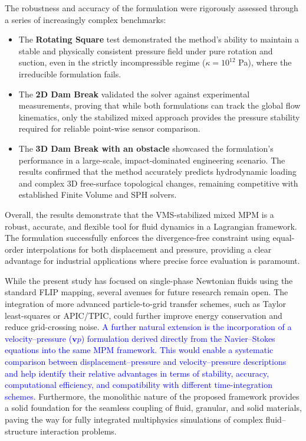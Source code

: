 \documentclass[11pt,english]{article}
\newcommand{\LM}[1]{\textcolor{blue}{#1}}
\def\vp{$\boldsymbol{v}p$\xspace}
\begin{document}
The robustness and accuracy of the formulation were rigorously assessed through a series of increasingly complex benchmarks:
\begin{itemize}
    \item The \textbf{Rotating Square} test demonstrated the method's ability to maintain a stable and physically consistent pressure field under pure rotation and suction, even in the strictly incompressible regime ($\kappa = 10^{12}$ Pa), where the irreducible formulation fails.
    \item The \textbf{2D Dam Break} validated the solver against experimental measurements, proving that while both formulations can track the global flow kinematics, only the stabilized mixed approach provides the pressure stability required for reliable point-wise sensor comparison.
    \item The \textbf{3D Dam Break with an obstacle} showcased the formulation's performance in a large-scale, impact-dominated engineering scenario. The results confirmed that the method accurately predicts hydrodynamic loading and complex 3D free-surface topological changes, remaining competitive with established Finite Volume and SPH solvers.
\end{itemize}

Overall, the results demonstrate that the VMS-stabilized mixed MPM is a robust, accurate, and flexible tool for fluid dynamics in a Lagrangian framework. The formulation successfully enforces the divergence-free constraint using equal-order interpolations for both displacement and pressure, providing a clear advantage for industrial applications where precise force evaluation is paramount.


While the present study has focused on single-phase Newtonian fluids using the standard FLIP mapping, several avenues for future research remain open. The integration of more advanced particle-to-grid transfer schemes, such as Taylor least-squares or APIC/TPIC, could further improve energy conservation and reduce grid-crossing noise. \LM{A further natural extension is the incorporation of a velocity–pressure (\vp) formulation derived directly from the Navier–Stokes equations into the same MPM framework. This would enable a systematic comparison between displacement–pressure and velocity–pressure descriptions and help identify their relative advantages in terms of stability, accuracy, computational efficiency, and compatibility with different time-integration schemes.} Furthermore, the monolithic nature of the proposed framework provides a solid foundation for the seamless coupling of fluid, granular, and solid materials, paving the way for fully integrated multiphysics simulations of complex fluid–structure interaction problems.
\end{document}
